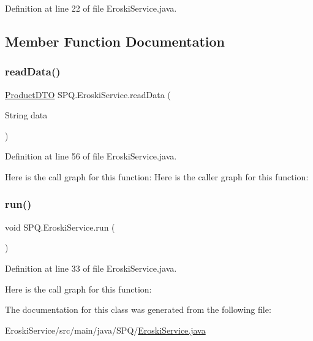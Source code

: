 Definition at line 22 of file Eroski\+Service.\+java.



\subsection{Member Function Documentation}
\mbox{\label{class_s_p_q_1_1_eroski_service_a89fa3f97cdca647e3c6d6606e5dc2443}} 
\subsubsection{\texorpdfstring{read\+Data()}{readData()}}
{\footnotesize\ttfamily \mbox{\hyperlink{class_s_p_q_1_1dto_1_1_product_d_t_o}{Product\+D\+TO}} S\+P\+Q.\+Eroski\+Service.\+read\+Data (\begin{DoxyParamCaption}\item[{String}]{data }\end{DoxyParamCaption})}



Definition at line 56 of file Eroski\+Service.\+java.

Here is the call graph for this function\+:
Here is the caller graph for this function\+:
\mbox{\label{class_s_p_q_1_1_eroski_service_abacda123f2febc1eb7c2825eb4e46c37}} 
\subsubsection{\texorpdfstring{run()}{run()}}
{\footnotesize\ttfamily void S\+P\+Q.\+Eroski\+Service.\+run (\begin{DoxyParamCaption}{ }\end{DoxyParamCaption})}



Definition at line 33 of file Eroski\+Service.\+java.

Here is the call graph for this function\+:


The documentation for this class was generated from the following file\+:\begin{DoxyCompactItemize}
\item 
Eroski\+Service/src/main/java/\+S\+P\+Q/\mbox{\hyperlink{_eroski_service_8java}{Eroski\+Service.\+java}}\end{DoxyCompactItemize}
